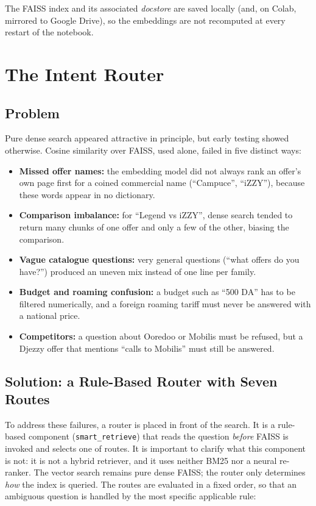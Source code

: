 \documentclass[12pt, a4paper]{report}
\newcommand{\humantext}[1]{#1}      %
\begin{document}
\humantext{The FAISS index and its associated \textit{docstore} are saved locally (and, on Colab, mirrored to Google Drive), so the embeddings are not recomputed at every restart of the notebook.}

\section{The Intent Router}

\subsection{Problem}
\humantext{Pure dense search appeared attractive in principle, but early testing showed otherwise. Cosine similarity over FAISS, used alone, failed in five distinct ways:}
\begin{itemize}[noitemsep]
    \item \humantext{\textbf{Missed offer names:} the embedding model did not always rank an offer's own page first for a coined commercial name (``Campuce'', ``iZZY''), because these words appear in no dictionary.}
    \item \humantext{\textbf{Comparison imbalance:} for ``Legend vs iZZY'', dense search tended to return many chunks of one offer and only a few of the other, biasing the comparison.}
    \item \humantext{\textbf{Vague catalogue questions:} very general questions (``what offers do you have?'') produced an uneven mix instead of one line per family.}
    \item \humantext{\textbf{Budget and roaming confusion:} a budget such as ``500 DA'' has to be filtered numerically, and a foreign roaming tariff must never be answered with a national price.}
    \item \humantext{\textbf{Competitors:} a question about Ooredoo or Mobilis must be refused, but a Djezzy offer that mentions ``calls to Mobilis'' must still be answered.}
\end{itemize}

\subsection{Solution: a Rule-Based Router with Seven Routes}
\humantext{To address these failures, a router is placed in front of the search. It is a rule-based component (\texttt{smart\_retrieve}) that reads the question \emph{before} FAISS is invoked and selects one of \numRoutes{} routes. It is important to clarify what this component is not: it is not a hybrid retriever, and it uses neither BM25 nor a neural re-ranker. The vector search remains pure dense FAISS; the router only determines \emph{how} the index is queried. The routes are evaluated in a fixed order, so that an ambiguous question is handled by the most specific applicable rule:}
\end{document}
